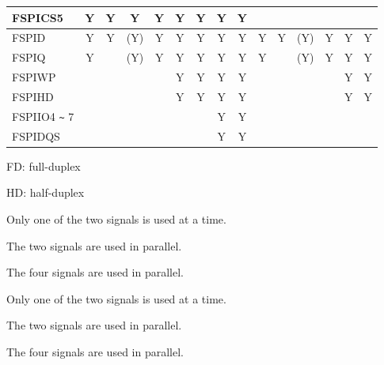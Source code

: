 \documentclass[main\_\_EN.tex]{subfiles}
\begin{document}
\begin{landscape}
\begin{table}[H]
\begin{threeparttable}
\begin{tabular}{ |p{2.0cm} |c|c|c|c|c|c|c|c|c|c|c|c|c|c| }
FSPICS5                  & Y       & Y       & Y       & Y       & Y       & Y      & Y       & Y      &         &        &         &         &         &        \\ \hline
FSPID                    & Y       & Y       & (Y)\tnote{3}      & Y\tnote{4}      & Y\tnote{5}      & Y      & Y       & Y      & Y       & Y      & (Y)\tnote{6}      & Y\tnote{7}     & Y\tnote{8}     & Y      \\ \hline
FSPIQ                    & Y       &         & (Y)\tnote{3}      & Y\tnote{4}      & Y\tnote{5}      & Y       & Y      & Y      & Y       &        & (Y)\tnote{6}     & Y\tnote{7}     & Y\tnote{8}      & Y      \\ \hline
FSPIWP                   &         &         &         &         & Y\tnote{5}      & Y       & Y      & Y      &         &        &         &         & Y\tnote{8}       & Y      \\ \hline
FSPIHD                   &         &         &         &         & Y\tnote{5}      & Y       & Y      & Y      &         &        &         &         & Y\tnote{8}       & Y      \\ \hline
FSPIIO4 \verb+~+ 7 &         &         &         &         &       &        & Y      & Y      &         &        &         &         &        &      \\ \hline
FSPIDQS &         &         &         &         &       &        & Y      & Y      &         &        &         &         &        &      \\ \hline
\end{tabular}

                \begin{tablenotes}
                \item[1] FD: full-duplex
                \item[2] HD: half-duplex
                \item[3] Only one of the two signals is used at a time.
                \item[4] The two signals are used in parallel.
                \item[5] The four signals are used in parallel.
                \item[6] Only one of the two signals is used at a time.
                \item[7] The two signals are used in parallel.
                \item[8] The four signals are used in parallel.
        \end{tablenotes}
     \end{threeparttable}
    \end{table}


\end{landscape}
\end{document}

